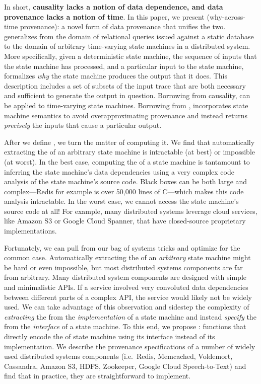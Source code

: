 In short, \textbf{causality lacks a notion of data dependence, and data
provenance lacks a notion of time}. In this paper, we present
 (why-across-time provenance): a novel form of data
provenance that unifies the two. \Watprovenance{} generalizes \whyprovenance{}
from the domain of relational queries issued against a static database to the
domain of arbitrary time-varying state machines in a distributed system. More
specifically, given a deterministic state machine, the sequence of inputs that
the state machine has processed, and a particular input to the state machine,
\watprovenance{} formalizes \emph{why} the state machine produces the output
that it does. This description includes a set of subsets of the input trace
that are both necessary and sufficient to generate the output in question.
Borrowing from causality, \watprovenance{} can be applied to time-varying state
machines.  Borrowing from \whyprovenance{}, \watprovenance{} incorporates state
machine semantics to avoid overapproximating provenance and instead returns
\emph{precisely} the inputs that cause a particular output.

After we define \watprovenance{}, we turn the matter of computing it. We find
that automatically extracting the \watprovenance{} of an arbitrary state
machine is intractable (at best) or impossible (at worst). In the best case,
computing the \watprovenance{} of a state machine is tantamount to inferring
the state machine's data dependencies using a very complex code analysis of the
state machine's source code. Black boxes can be both large and complex---Redis
for example is over 50,000 lines of C---which makes this code analysis
intractable. In the worst case, we cannot access the state machine's source
code at all! For example, many distributed systems leverage cloud services,
like Amazon S3 or Google Cloud Spanner, that have closed-source proprietary
implementations.

Fortunately, we can pull from our bag of systems tricks and optimize for the
common case. Automatically extracting the \watprovenance{} of an
\emph{arbitrary} state machine might be hard or even impossible, but most
distributed systems components are far from arbitrary. Many distributed system
components are designed with simple and minimalistic APIs. If a service
involved very convoluted data dependencies between different parts of a complex
API, the service would likely not be widely used. We can take advantage of this
observation and sidestep the complexity of \emph{extracting} the
\watprovenance{} from the \emph{implementation} of a state machine and instead
\emph{specify} the \watprovenance{} from the \emph{interface} of a state
machine. To this end, we propose :
functions that directly encode the \watprovenance{} of state machine using its
interface instead of its implementation.  We describe the provenance
specifications of a number of widely used distributed systems components
(i.e.\ Redis, Memcached, Voldemort, Cassandra, Amazon S3, HDFS, Zookeeper,
Google Cloud Speech-to-Text) and find that in practice, they are
straightforward to implement.

